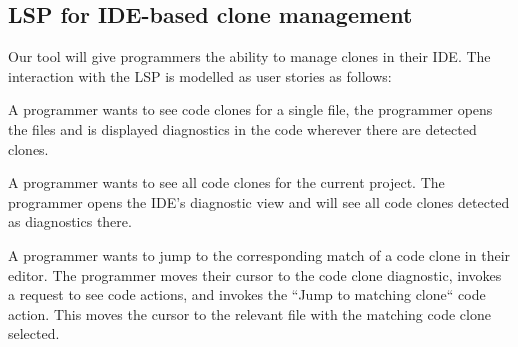 \documentclass[12pt]{article}
\begin{document}
\subsection{LSP for IDE-based clone management}

Our tool will give programmers the ability to manage clones in their IDE. The interaction
with the LSP is modelled as user stories as follows:

A programmer wants to see code clones for a single file, the programmer opens the files
and is displayed diagnostics in the code wherever there are detected clones.

A programmer wants to see all code clones for the current project. The programmer opens
the IDE's diagnostic view and will see all code clones detected as diagnostics there.

A programmer wants to jump to the corresponding match of a code clone in their editor. The
programmer moves their cursor to the code clone diagnostic, invokes a request to see code
actions, and invokes the ``Jump to matching clone`` code action. This moves the cursor to
the relevant file with the matching code clone selected.




\end{document}
